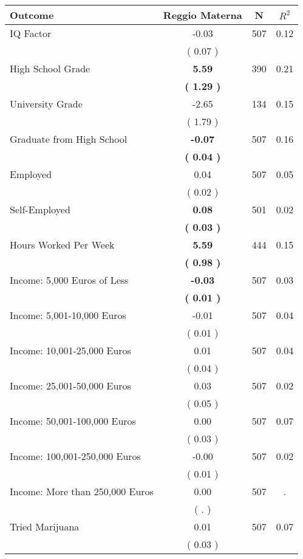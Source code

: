 \begin{tabular}{lccc}
\toprule
 \textbf{Outcome} & \textbf{Reggio Materna} & \textbf{N} & \textbf{$ R^2$} \\
\midrule
IQ Factor &     -0.03 & 507 &      0.12 \\ 
 & (     0.07 ) & \\
High School Grade & \textbf{     5.59} & 390 &      0.21 \\ 
 & \textbf{(     1.29 )} & \\
University Grade &     -2.65 & 134 &      0.15 \\ 
 & (     1.79 ) & \\
Graduate from High School & \textbf{    -0.07} & 507 &      0.16 \\ 
 & \textbf{(     0.04 )} & \\
Employed &      0.04 & 507 &      0.05 \\ 
 & (     0.02 ) & \\
Self-Employed & \textbf{     0.08} & 501 &      0.02 \\ 
 & \textbf{(     0.03 )} & \\
Hours Worked Per Week & \textbf{     5.59} & 444 &      0.15 \\ 
 & \textbf{(     0.98 )} & \\
Income: 5,000 Euros of Less & \textbf{    -0.03} & 507 &      0.03 \\ 
 & \textbf{(     0.01 )} & \\
Income: 5,001-10,000 Euros &     -0.01 & 507 &      0.04 \\ 
 & (     0.01 ) & \\
Income: 10,001-25,000 Euros &      0.01 & 507 &      0.04 \\ 
 & (     0.04 ) & \\
Income: 25,001-50,000 Euros &      0.03 & 507 &      0.02 \\ 
 & (     0.05 ) & \\
Income: 50,001-100,000 Euros &      0.00 & 507 &      0.07 \\ 
 & (     0.03 ) & \\
Income: 100,001-250,000 Euros &     -0.00 & 507 &      0.02 \\ 
 & (     0.01 ) & \\
Income: More than 250,000 Euros &      0.00 & 507 &         . \\ 
 & (        . ) & \\
Tried Marijuana &      0.01 & 507 &      0.07 \\ 
 & (     0.03 ) & \\

\end{tabular}
